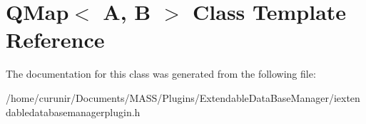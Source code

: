 \hypertarget{class_q_map}{}\section{Q\+Map$<$ A, B $>$ Class Template Reference}
\label{class_q_map}


The documentation for this class was generated from the following file\+:\begin{DoxyCompactItemize}
\item 
/home/curunir/\+Documents/\+M\+A\+S\+S/\+Plugins/\+Extendable\+Data\+Base\+Manager/iextendabledatabasemanagerplugin.\+h\end{DoxyCompactItemize}
